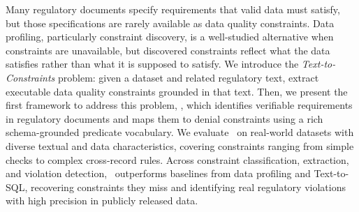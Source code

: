 Many regulatory documents specify requirements that valid data must satisfy, but those specifications are rarely available as data quality constraints. 
Data profiling, particularly constraint discovery, is a well-studied alternative when constraints are unavailable, but discovered constraints reflect what the data satisfies rather than what it is supposed to satisfy.
We introduce the \emph{Text-to-Constraints} problem: given a dataset and related regulatory text, extract executable data quality constraints grounded in that text. 
Then, we present the first framework to address this problem, \system, which identifies verifiable requirements in regulatory documents and maps them to denial constraints using a rich schema-grounded predicate vocabulary. 
We evaluate \system\ on real-world datasets with diverse textual and data characteristics, covering constraints ranging from simple checks to complex cross-record rules. Across constraint classification, extraction, and violation detection, \system\ outperforms baselines from data profiling and Text-to-SQL, recovering constraints they miss and identifying real regulatory violations with high precision in publicly released data.







